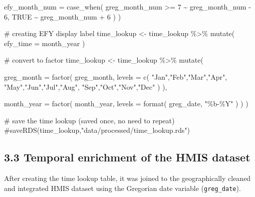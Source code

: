 \documentclass[
  letterpaper,
  DIV=11,
  numbers=noendperiod]{scrartcl}
\newenvironment{Shaded}{\begin{snugshade}}{\end{snugshade}}
\newcommand{\AttributeTok}[1]{\textcolor[rgb]{0.40,0.45,0.13}{#1}}
\newcommand{\CommentTok}[1]{\textcolor[rgb]{0.37,0.37,0.37}{#1}}
\newcommand{\ConstantTok}[1]{\textcolor[rgb]{0.56,0.35,0.01}{#1}}
\newcommand{\DecValTok}[1]{\textcolor[rgb]{0.68,0.00,0.00}{#1}}
\newcommand{\FunctionTok}[1]{\textcolor[rgb]{0.28,0.35,0.67}{#1}}
\newcommand{\NormalTok}[1]{\textcolor[rgb]{0.00,0.23,0.31}{#1}}
\newcommand{\OtherTok}[1]{\textcolor[rgb]{0.00,0.23,0.31}{#1}}
\newcommand{\SpecialCharTok}[1]{\textcolor[rgb]{0.37,0.37,0.37}{#1}}
\newcommand{\StringTok}[1]{\textcolor[rgb]{0.13,0.47,0.30}{#1}}
\begin{document}
\begin{Shaded}
\begin{Highlighting}[]
    \AttributeTok{efy\_month\_num =} \FunctionTok{case\_when}\NormalTok{(}
\NormalTok{      greg\_month\_num }\SpecialCharTok{\textgreater{}=} \DecValTok{7} \SpecialCharTok{\textasciitilde{}}\NormalTok{ greg\_month\_num }\SpecialCharTok{{-}} \DecValTok{6}\NormalTok{,}
      \ConstantTok{TRUE} \SpecialCharTok{\textasciitilde{}}\NormalTok{ greg\_month\_num }\SpecialCharTok{+} \DecValTok{6}
\NormalTok{    )}
\NormalTok{  )}


\CommentTok{\# creating EFY display label}
\NormalTok{time\_lookup }\OtherTok{\textless{}{-}}\NormalTok{ time\_lookup }\SpecialCharTok{\%\textgreater{}\%}
  \FunctionTok{mutate}\NormalTok{(}
    \AttributeTok{efy\_time =}\NormalTok{ month\_year}
\NormalTok{  )}

\CommentTok{\# convert to factor}
\NormalTok{time\_lookup }\OtherTok{\textless{}{-}}\NormalTok{ time\_lookup }\SpecialCharTok{\%\textgreater{}\%}
  \FunctionTok{mutate}\NormalTok{(}
    
    \AttributeTok{greg\_month =} \FunctionTok{factor}\NormalTok{(}
\NormalTok{      greg\_month,}
      \AttributeTok{levels =} \FunctionTok{c}\NormalTok{(}
        \StringTok{"Jan"}\NormalTok{,}\StringTok{"Feb"}\NormalTok{,}\StringTok{"Mar"}\NormalTok{,}\StringTok{"Apr"}\NormalTok{,}
        \StringTok{"May"}\NormalTok{,}\StringTok{"Jun"}\NormalTok{,}\StringTok{"Jul"}\NormalTok{,}\StringTok{"Aug"}\NormalTok{,}
        \StringTok{"Sep"}\NormalTok{,}\StringTok{"Oct"}\NormalTok{,}\StringTok{"Nov"}\NormalTok{,}\StringTok{"Dec"}
\NormalTok{      )}
\NormalTok{    ),}
    
    \AttributeTok{month\_year =} \FunctionTok{factor}\NormalTok{(}
\NormalTok{      month\_year,}
      \AttributeTok{levels =} \FunctionTok{format}\NormalTok{(}
\NormalTok{        greg\_date,}
        \StringTok{"\%b{-}\%Y"}
\NormalTok{      )}
\NormalTok{    )}
\NormalTok{  )}

\CommentTok{\# save the time lookup (saved once, no need to repeat)}
\CommentTok{\#saveRDS(time\_lookup,"data/processed/time\_lookup.rds")}
\end{Highlighting}
\end{Shaded}

\subsection{3.3 Temporal enrichment of the HMIS
dataset}\label{temporal-enrichment-of-the-hmis-dataset}

After creating the time lookup table, it was joined to the
geographically cleaned and integrated HMIS dataset using the Gregorian
date variable (\texttt{greg\_date}).
\end{document}
